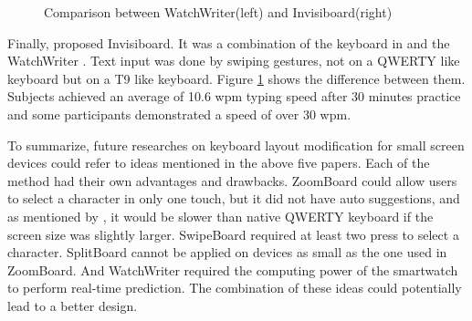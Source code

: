 \documentclass[11pt]{article}
\begin{document}
\begin{figure}[H]
\centering
{}\hfill
{}\hfill
\caption{Comparison between WatchWriter(left) and Invisiboard(right)} \label{fig:watchcomparison}
\end{figure}

Finally, \citet{10.1145/2935334.2935360} proposed Invisiboard. It was a combination of the keyboard in \citet{6926662} and the WatchWriter \citep{10.1145/2858036.2858242}. Text input was done by swiping gestures, not on a QWERTY like keyboard but on a T9 like keyboard. Figure \ref{fig:watchcomparison} shows the difference between them. Subjects achieved an average of 10.6 wpm typing speed after 30 minutes practice and some participants demonstrated a speed of over 30 wpm.

To summarize, future researches on keyboard layout modification for small screen devices could refer to ideas mentioned in the above five papers. Each of the method had their own advantages and drawbacks. ZoomBoard could allow users to select a character in only one touch, but it did not have auto suggestions, and as mentioned by \citet{10.1145/2702123.2702273}, it would be slower than native QWERTY keyboard if the screen size was slightly larger. SwipeBoard required at least two press to select a character. SplitBoard cannot be applied on devices as small as the one used in ZoomBoard. And WatchWriter required the computing power of the smartwatch to perform real-time prediction. The combination of these ideas could potentially lead to a better design.
\end{document}
